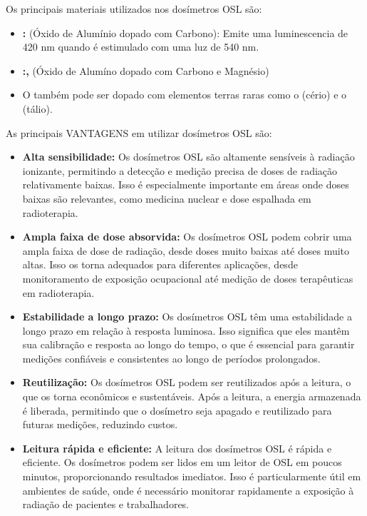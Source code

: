 \documentclass[11pt,a4paper]{article}
\begin{document}
		Os principais materiais utilizados nos dosímetros OSL são:
		\begin{itemize}[label=\textcolor{CarnationPink}{$\star$}]
			\item \textbf{:} (Óxido de Alumínio dopado com Carbono): Emite uma luminescencia de 420 nm quando é estimulado com uma luz de 540 nm.
			\item \textbf{:, } (Óxido de Alumíno dopado com Carbono e Magnésio)
			\item O \textbf{} também pode ser dopado com elementos terras raras como o  (cério) e o  (tálio).
		\end{itemize}

		As principais \textcolor{CarnationPink}{VANTAGENS} em utilizar dosímetros OSL são:

		\begin{itemize}[label=\textcolor{CarnationPink}{$\blacktriangleright$}]
			\item \textbf{Alta sensibilidade:} Os dosímetros OSL são altamente sensíveis à radiação ionizante, permitindo a detecção e medição precisa de doses de radiação relativamente baixas. Isso é especialmente importante em áreas onde doses baixas são relevantes, como medicina nuclear e dose espalhada em radioterapia.
			\item \textbf{Ampla faixa de dose absorvida:} Os dosímetros OSL podem cobrir uma ampla faixa de dose de radiação, desde doses muito baixas até doses muito altas. Isso os torna adequados para diferentes aplicações, desde monitoramento de exposição ocupacional até medição de doses terapêuticas em radioterapia.
			\item \textbf{Estabilidade a longo prazo:} Os dosímetros OSL têm uma estabilidade a longo prazo em relação à resposta luminosa. Isso significa que eles mantêm sua calibração e resposta ao longo do tempo, o que é essencial para garantir medições confiáveis e consistentes ao longo de períodos prolongados.
			\item \textbf{Reutilização:} Os dosímetros OSL podem ser reutilizados após a leitura, o que os torna econômicos e sustentáveis. Após a leitura, a energia armazenada é liberada, permitindo que o dosímetro seja apagado e reutilizado para futuras medições, reduzindo custos.
			\item \textbf{Leitura rápida e eficiente:} A leitura dos dosímetros OSL é rápida e eficiente. Os dosímetros podem ser lidos em um leitor de OSL em poucos minutos, proporcionando resultados imediatos. Isso é particularmente útil em ambientes de saúde, onde é necessário monitorar rapidamente a exposição à radiação de pacientes e trabalhadores.
		\end{itemize}
\end{document}
